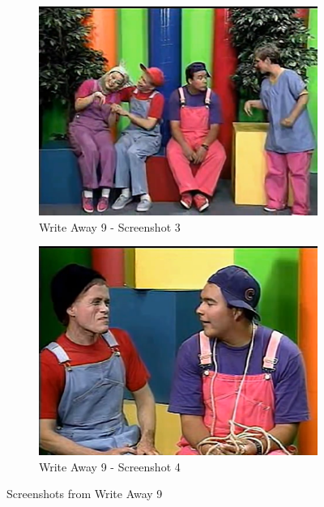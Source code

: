 \begin{figure}[H]
    \begin{subfigure}{0.45\textwidth}
        \centering
        \includegraphics[width=\linewidth]{Games/WriteAway/Images/WriteAway9Screenshot3.png}
        \caption{Write Away 9 - Screenshot 3}
    \end{subfigure}
    \begin{subfigure}{0.45\textwidth}
        \centering
        \includegraphics[width=\linewidth]{Games/WriteAway/Images/WriteAway9Screenshot4.png}
        \caption{Write Away 9 - Screenshot 4}
    \end{subfigure}
    \caption{Screenshots from Write Away 9}
\end{figure}
